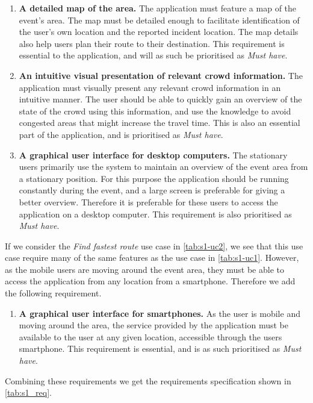 \begin{enumerate}
    \item \textbf{A detailed map of the area.} The application must feature a map of the event's area. The map must be detailed enough to facilitate identification of the user's own location and the reported incident location. The map details also help users plan their route to their destination. This requirement is essential to the application, and will as such be prioritised as \emph{Must have}.
    \item \textbf{An intuitive visual presentation of relevant crowd information.} The application must visually present any relevant crowd information in an intuitive manner. The user should be able to quickly gain an overview of the state of the crowd using this information, and use the knowledge to avoid congested areas that might increase the travel time. This is also an essential part of the application, and is prioritised as \emph{Must have}.
    \item \textbf{A graphical user interface for desktop computers.} The stationary users primarily use the system to maintain an overview of the event area from a stationary position. For this purpose the application should be running constantly during the event, and a large screen is preferable for giving a better overview. Therefore it is preferable for these users to access the application on a desktop computer. This requirement is also prioritised as \emph{Must have}.
\end{enumerate}

If we consider the \emph{Find fastest route} use case in \cref{tab:s1-uc2}, we see that this use case require many of the same features as the use case in \cref{tab:s1-uc1}. However, as the mobile users are moving around the event area, they must be able to access the application from any location from a smartphone. Therefore we add the following requirement.

\begin{enumerate}[resume]
    \item \textbf{A graphical user interface for smartphones.} As the user is mobile and moving around the area, the service provided by the application must be available to the user at any given location, accessible through the users smartphone. This requirement is essential, and is as such prioritised as \emph{Must have}.

\end{enumerate}

Combining these requirements we get the requirements specification shown in \cref{tab:s1_req}.

